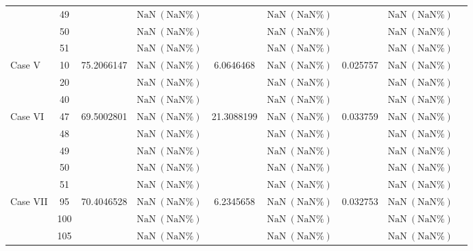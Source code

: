 \begin{table}[htbp]
{\begin{tabular}{lclcccccc}
    & 49 & & $\mathrm{NaN}\ (\mathrm{NaN}\%)$ & & $\mathrm{NaN}\ (\mathrm{NaN}\%)$ & & $\mathrm{NaN}\ (\mathrm{NaN}\%)$ \\
    & 50 & & $\mathrm{NaN}\ (\mathrm{NaN}\%)$ & & $\mathrm{NaN}\ (\mathrm{NaN}\%)$ & & $\mathrm{NaN}\ (\mathrm{NaN}\%)$ \\
    & 51 & & $\mathrm{NaN}\ (\mathrm{NaN}\%)$ & & $\mathrm{NaN}\ (\mathrm{NaN}\%)$ & & $\mathrm{NaN}\ (\mathrm{NaN}\%)$ \\
    \midrule
    \multirow{3}{*}{Case V} & 10 & \multirow{3}{*}{75.2066147} & $\mathrm{NaN}\ (\mathrm{NaN}\%)$ & \multirow{3}{*}{6.0646468} & $\mathrm{NaN}\ (\mathrm{NaN}\%)$ & \multirow{3}{*}{0.025757} & $\mathrm{NaN}\ (\mathrm{NaN}\%)$ \\
    & 20 & & $\mathrm{NaN}\ (\mathrm{NaN}\%)$ & & $\mathrm{NaN}\ (\mathrm{NaN}\%)$ & & $\mathrm{NaN}\ (\mathrm{NaN}\%)$ \\
    & 40 & & $\mathrm{NaN}\ (\mathrm{NaN}\%)$ & & $\mathrm{NaN}\ (\mathrm{NaN}\%)$ & & $\mathrm{NaN}\ (\mathrm{NaN}\%)$ \\
    \midrule
    \multirow{5}{*}{Case VI} & 47 & \multirow{5}{*}{69.5002801} & $\mathrm{NaN}\ (\mathrm{NaN}\%)$ & \multirow{5}{*}{21.3088199} & $\mathrm{NaN}\ (\mathrm{NaN}\%)$ & \multirow{5}{*}{0.033759} & $\mathrm{NaN}\ (\mathrm{NaN}\%)$ \\
    & 48 & & $\mathrm{NaN}\ (\mathrm{NaN}\%)$ & & $\mathrm{NaN}\ (\mathrm{NaN}\%)$ & & $\mathrm{NaN}\ (\mathrm{NaN}\%)$ \\
    & 49 & & $\mathrm{NaN}\ (\mathrm{NaN}\%)$ & & $\mathrm{NaN}\ (\mathrm{NaN}\%)$ & & $\mathrm{NaN}\ (\mathrm{NaN}\%)$ \\
    & 50 & & $\mathrm{NaN}\ (\mathrm{NaN}\%)$ & & $\mathrm{NaN}\ (\mathrm{NaN}\%)$ & & $\mathrm{NaN}\ (\mathrm{NaN}\%)$ \\
    & 51 & & $\mathrm{NaN}\ (\mathrm{NaN}\%)$ & & $\mathrm{NaN}\ (\mathrm{NaN}\%)$ & & $\mathrm{NaN}\ (\mathrm{NaN}\%)$ \\
    \midrule
    \multirow{3}{*}{Case VII} & 95 & \multirow{3}{*}{70.4046528} & $\mathrm{NaN}\ (\mathrm{NaN}\%)$ & \multirow{3}{*}{6.2345658} & $\mathrm{NaN}\ (\mathrm{NaN}\%)$ & \multirow{3}{*}{0.032753} & $\mathrm{NaN}\ (\mathrm{NaN}\%)$ \\
    & 100 & & $\mathrm{NaN}\ (\mathrm{NaN}\%)$ & & $\mathrm{NaN}\ (\mathrm{NaN}\%)$ & & $\mathrm{NaN}\ (\mathrm{NaN}\%)$ \\
    & 105 & & $\mathrm{NaN}\ (\mathrm{NaN}\%)$ & & $\mathrm{NaN}\ (\mathrm{NaN}\%)$ & & $\mathrm{NaN}\ (\mathrm{NaN}\%)$ \\
    \bottomrule
  \end{tabular}%
  }
\end{table}

